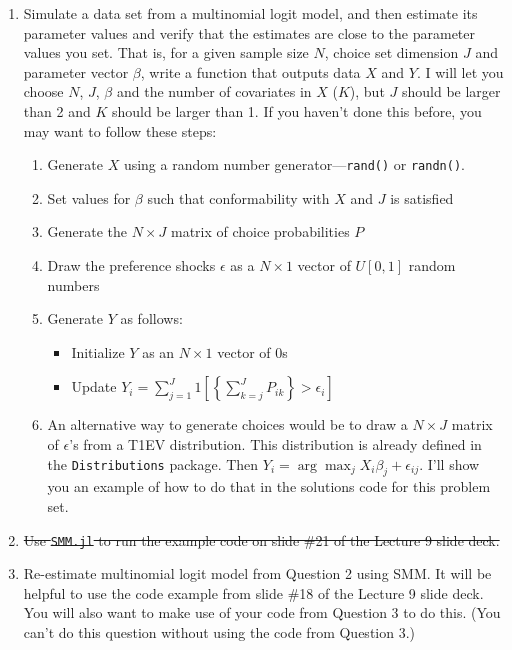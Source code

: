 \documentclass[12pt,english]{article}
\begin{document}
\begin{enumerate}
\item Simulate a data set from a multinomial logit model, and then estimate its parameter values and verify that the estimates are close to the parameter values you set. That is, for a given sample size $N$, choice set dimension $J$ and parameter vector $\beta$, write a function that outputs data $X$ and $Y$. I will let you choose $N$, $J$, $\beta$ and the number of covariates in $X$ ($K$), but $J$ should be larger than 2 and $K$ should be larger than 1. If you haven't done this before, you may want to follow these steps:
    \begin{enumerate}
    \item Generate $X$ using a random number generator---\texttt{rand()} or \texttt{randn()}.
    \item Set values for $\beta$ such that conformability with $X$ and $J$ is satisfied
    \item Generate the $N\times J$ matrix of choice probabilities $P$
    \item Draw the preference shocks $\epsilon$ as a $N\times 1$ vector of $U[0,1]$ random numbers
    \item Generate $Y$ as follows:
        \begin{itemize}
        \item Initialize $Y$ as an $N\times 1$ vector of 0s
        \item Update $Y_i = \sum_{j=1}^J 1\left[\left\{\sum_{k=j}^J  P_{ik}\right\} > 
        \epsilon_i\right]$
        \end{itemize}
    \item An alternative way to generate choices would be to draw a $N\times J$ matrix of $\epsilon$'s from a T1EV distribution. This distribution is already defined in the \texttt{Distributions} package. Then $Y_i = \arg \max_{j} X_i \beta_j + \epsilon_{ij}$. I'll show you an example of how to do that in the solutions code for this problem set.
    \end{enumerate}
\item \sout{Use \texttt{SMM.jl} to run the example code on slide \#21 of the Lecture 9 slide deck.}

\item Re-estimate multinomial logit model from Question 2 using SMM. It will be helpful to use the code example from slide \#18 of the Lecture 9 slide deck. You will also want to make use of your code from Question 3 to do this. (You can't do this question without using the code from Question 3.)

\end{enumerate}
\end{document}

